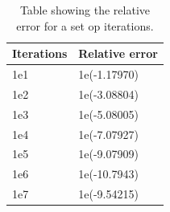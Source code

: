 \documentclass[twoside,twocolumn]{article}
\begin{document}
\begin{table}[htp]
\centering
\begin{tabular}{|l|l|} \hline
Iterations & Relative error\\ \hline
1e1 & 1e(-1.17970)\\
1e2 & 1e(-3.08804)\\
1e3 & 1e(-5.08005)\\
1e4 & 1e(-7.07927)\\
1e5 & 1e(-9.07909)\\
1e6 & 1e(-10.7943)\\
1e7 & 1e(-9.54215)\\ \hline
\end{tabular}
\caption{Table showing the relative error for a set op iterations.}
\end{table}

\twocolumn[{%
{}

}]
\end{document}
